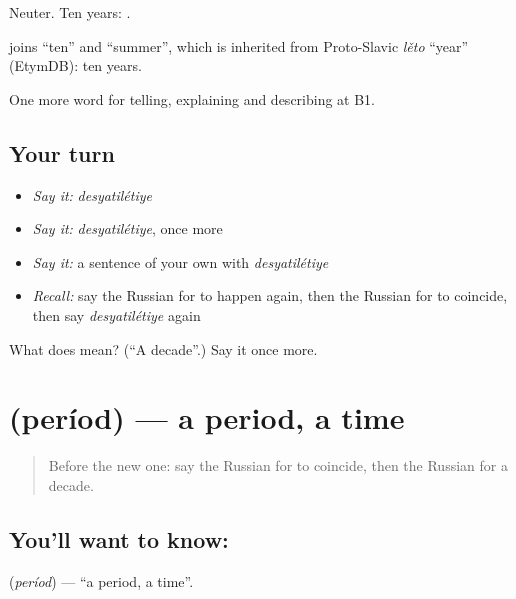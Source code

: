 Neuter. Ten years: \emph{ }.

\begin{cousinweb}
\emph{} joins \emph{} \textquotedblleft{}ten\textquotedblright{} and \emph{} \textquotedblleft{}summer\textquotedblright{}, which is inherited from Proto-Slavic \emph{lěto} \textquotedblleft{}year\textquotedblright{} (EtymDB): ten years.
\end{cousinweb}

\begin{grammarlens}[title={What you've built}]
One more word for telling, explaining and describing at B1.
\end{grammarlens}

\subsection*{Your turn}
\begin{itemize}
\raggedright
  \item \emph{Say it:} \emph{desyatilétiye}
  \item \emph{Say it:} \emph{desyatilétiye}, once more
  \item \emph{Say it:} a sentence of your own with \emph{desyatilétiye}
  \item \emph{Recall:} say the Russian for to happen again, then the Russian for to coincide, then say \emph{desyatilétiye} again
\end{itemize}

\begin{tcolorbox}[breakable,colback=teal!4,colframe=teal!35!black,title={Before you move on}]
What does  mean? (\textquotedblleft{}A decade\textquotedblright{}.) Say it once more.
\end{tcolorbox}
\section[\texorpdfstring{\ru{период} (períod)}{период (períod)}]{ (períod) — a period, a time}

\label{lesson:RU-C276-period}



\begin{quote}
Before the new one: say the Russian for to coincide, then the Russian for a decade.
\end{quote}

\subsection*{You'll want to know: }
\textbf{} (\emph{períod}) — \textquotedblleft{}a period, a time\textquotedblright{}.

